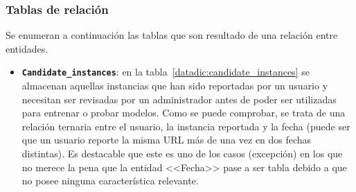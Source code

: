 \subsubsection{Tablas de relación}

Se enumeran a continuación las tablas que son resultado de una relación entre entidades.

\begin{itemize}
	\item \textbf{\texttt{Candidate\_instances}}: en la tabla~\ref{datadic:candidate_instances} se almacenan aquellas instancias que han sido reportadas por un usuario y necesitan ser revisadas por un administrador antes de poder ser utilizadas para entrenar o probar modelos. Como se puede comprobar, se trata de una relación ternaria entre el usuario, la instancia reportada y la fecha (puede ser que un usuario reporte la misma URL más de una vez en dos fechas distintas). Es destacable que este es uno de los casos (excepción) en los que no merece la pena que la entidad <<Fecha>> pase a ser tabla debido a que no posee ninguna característica relevante.
	
		\begin{table}
		\caption[Diccionario de datos: \texttt{Candidate\_instances}]{Diccionario de datos: tabla correspondiente a la clase \texttt{Candidate\_instances}.}
		\label{datadic:candidate_instances}
		\end{table}


\end{itemize}
